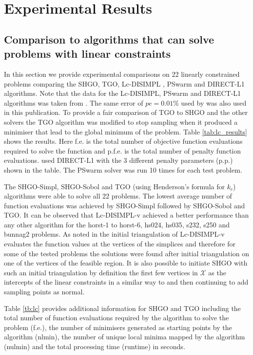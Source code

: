 \chapter{Experimental Results} \label{sec:results}
\section{Comparison to algorithms that can solve problems with linear constraints}

In this section we provide experimental comparisons on 22 linearly constrained problems comparing the SHGO, TGO, Lc-DISIMPL \citep{Paul2016}, PSwarm \citep{Vaz2008} and DIRECT-L1 \citep{finkel2003direct} algorithms. Note that the data for the Lc-DISIMPL, PSwarm and DIRECT-L1 algorithms was taken from \citet{Paul2016}. The same error of $pe = 0.01\%$ used by \citet{Paul2016} was also used in this publication. To provide a fair comparison of TGO to SHGO and the other solvers the TGO algorithm was modified to stop sampling when it produced a minimiser that lead to the global minimum of the problem. Table \ref{tab:lc_results} shows the results. Here f.e. is the total number of objective function evaluations required to solve the function and p.f.e. is the total number of penalty function evaluations. \citet{Paul2016} used DIRECT-L1 with the 3 different penalty parameters (p.p.) shown in the table. The PSwarm solver was run 10 times for each test problem. 

The SHGO-Simpl, SHGO-Sobol and TGO (using Henderson's formula for $k_c$) algorithms were able to solve all 22 problems. The lowest average number of function evaluations was achieved by SHGO-Simpl followed by SHGO-Sobol and TGO. It can be observed that Lc-DISIMPL-v achieved a better performance than any other algorithm for the horst-1 to horst-6, hs024, hs035, s232, s250 and bunnag2 problems. As noted in \citet{Paul2016} the initial triangulation of Lc-DISIMPL-v evaluates the function values at the vertices of the simplices and therefore for some of the tested problems the solutions were found after initial triangulation on one of the vertices of the feasible region. It is also possible to initiate SHGO with such an initial triangulation by definition the first few vertices in $\mathcal{X}$ as the intercepts of the linear constraints in a similar way to \citet{Paul2016} and then continuing to add sampling points as normal.

Table \ref{tb:lc} provides additional information for SHGO and TGO including the total number of function evaluations required by the algorithm to solve the problem (f.e.), the number of minimisers generated as starting points by the algorithm (nlmin), the number of unique local minima mapped by the algorithm (nulmin) and the total processing time (runtime) in seconds.

